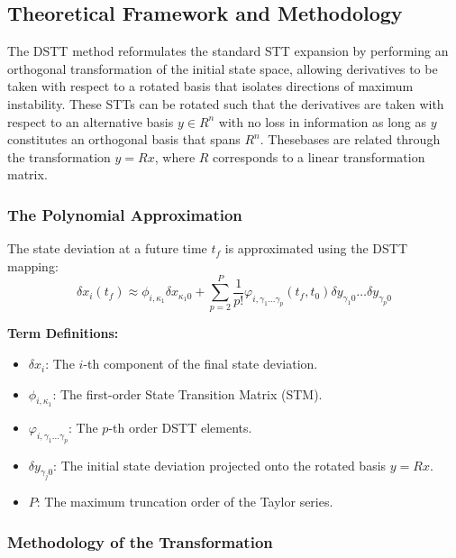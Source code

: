 \documentclass[
  letterpaper,
  DIV=11,
  numbers=noendperiod,
  oneside]{scrartcl}
\begin{document}
\subsection{Theoretical Framework and
Methodology}\label{theoretical-framework-and-methodology}

The DSTT method reformulates the standard STT expansion by performing an
orthogonal transformation of the initial state space, allowing
derivatives to be taken with respect to a rotated basis that isolates
directions of maximum instability. These STTs can be rotated such that
the derivatives are taken with respect to an alternative basis
\(y\in R^n\) with no loss in information as long as \(y\) constitutes an
orthogonal basis that spans \(R^n\). Thesebases are related through the
transformation \(y = Rx\), where \(R\) corresponds to a linear
transformation matrix.

\subsubsection{The Polynomial
Approximation}\label{the-polynomial-approximation}

The state deviation at a future time \(t_f\) is approximated using the
DSTT mapping: \[
\delta x_i(t_f) \approx \phi_{i, \kappa_1} \delta x_{\kappa_1 0} + \sum_{p=2}^{P} \frac{1}{p!} \varphi_{i, \gamma_1 \dots \gamma_p}(t_f, t_0) \delta y_{\gamma_1 0} \dots \delta y_{\gamma_p 0}
\]

\textbf{Term Definitions:}

\begin{itemize}
\item
  \(\delta x_i\): The \(i\)-th component of the final state deviation.
\item
  \(\phi_{i, \kappa_1}\): The first-order State Transition Matrix (STM).
\item
  \(\varphi_{i, \gamma_1 \dots \gamma_p}\): The \(p\)-th order DSTT
  elements.
\item
  \(\delta y_{\gamma_j 0}\): The initial state deviation projected onto
  the rotated basis \(y = Rx\).
\item
  \(P\): The maximum truncation order of the Taylor series.
\end{itemize}

\subsubsection{Methodology of the
Transformation}\label{methodology-of-the-transformation}
\end{document}

